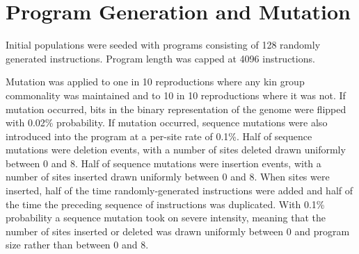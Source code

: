 \section{Program Generation and Mutation}

Initial populations were seeded with programs consisting of 128 randomly generated instructions.
Program length was capped at 4096 instructions.

Mutation was applied to one in 10 reproductions where any kin group commonality was maintained and to 10 in 10 reproductions where it was not.
If mutation occurred, bits in the binary representation of the genome were flipped with 0.02\% probability.
If mutation occurred, sequence mutations were also introduced into the program at a per-site rate of 0.1\%.
Half of sequence mutations were deletion events, with a number of sites deleted drawn uniformly between 0 and 8.
Half of sequence mutations were insertion events, with a number of sites inserted drawn uniformly between 0 and 8.
When sites were inserted, half of the time randomly-generated instructions were added and half of the time the preceding sequence of instructions was duplicated.
With 0.1\% probability a sequence mutation took on severe intensity, meaning that the number of sites inserted or deleted was drawn uniformly between 0 and program size rather than between 0 and 8.
